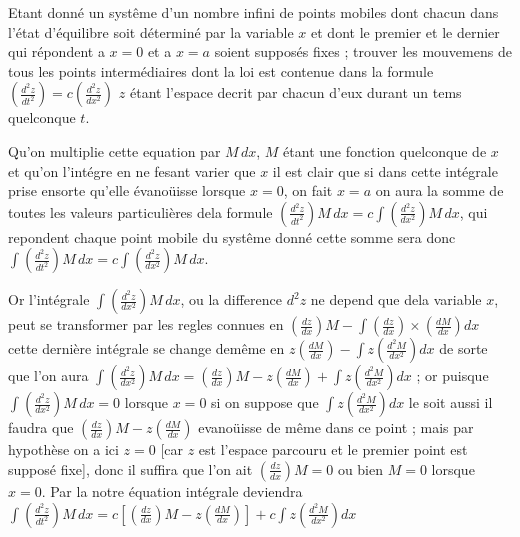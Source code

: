 \documentclass[11pt,a4paper]{article}
\begin{document}
Etant donné un systême d'un nombre infini de points mobiles dont
chacun dans l'état d'équilibre soit déterminé par la variable $x$ et dont
le premier et le dernier qui répondent a $x=0$ et a $x=a$ soient
supposés fixes ; trouver les mouvemens de tous les points intermédiaires
dont la loi est contenue dans la formule $\left(\frac{d^{2}z}{dt^{2}}\right)=c\left(\frac{d^{2}z}{dx^{2}}\right)$ $z$ étant
l'espace decrit par chacun d'eux durant un tems quelconque $t$.

Qu'on multiplie cette equation par $M\,dx$, $M$ étant une fonction quelconque
de $x$ et qu'on l'intégre en ne fesant varier que $x$ il est clair que si
dans cette intégrale prise ensorte qu'elle évanoüisse lorsque $x=0$, on
fait $x=a$ on aura la somme de toutes les valeurs particulières dela
formule $\left(\frac{d^{2}z}{dt^{2}}\right)M\,dx=c\int\left(\frac{d^{2}z}{dx^{2}}\right)M\,dx$, qui repondent  chaque point mobile
du systême donné cette somme sera donc $\int\left(\frac{d^{2}z}{dt^{2}}\right)M\,dx=c\int\left(\frac{d^{2}z}{dx^{2}}\right)M\,dx$.

Or l'intégrale $\int\left(\frac{d^{2}z}{dx^{2}}\right)M\,dx$, ou la difference $d^{2}z$ ne depend que dela variable
$x$, peut se transformer par les regles connues en $\left(\frac{dz}{dx}\right)M-\int\left(\frac{dz}{dx}\right)\times\left(\frac{dM}{dx}\right)dx$
cette dernière intégrale se change demême en $z\left(\frac{dM}{dx}\right)-\int z\left(\frac{d^{2}M}{dx^{2}}\right)dx$
de sorte que l'on aura $\int\left(\frac{d^{2}z}{dx^{2}}\right)M\,dx=\left(\frac{dz}{dx}\right)M-z\left(\frac{dM}{dx}\right)+\int z\left(\frac{d^{2}M}{dx^{2}}\right)dx$ ;
or puisque $\int\left(\frac{d^{2}z}{dx^{2}}\right)M\,dx=0$ lorsque $x=0$ si on suppose que
$\int z\left(\frac{d^{2}M}{dx^{2}}\right)dx$ le soit aussi il faudra que $\left(\frac{dz}{dx}\right)M-z\left(\frac{dM}{dx}\right)$ evanoüisse de
même dans ce point ; mais par hypothèse on a ici $z=0$ [car $z$ est l'espace
parcouru et le premier point est supposé fixe], donc il suffira que l'on
ait $\left(\frac{dz}{dx}\right)M=0$ ou bien $M=0$ lorsque $x=0$.
Par la notre équation intégrale deviendra $\int\left(\frac{d^{2}z}{dt^{2}}\right)M\,dx=c\left[\left(\frac{dz}{dx}\right)M-z\left(\frac{dM}{dx}\right)\right]+c\int z\left(\frac{d^{2}M}{dx^{2}}\right)dx$
\end{document}
